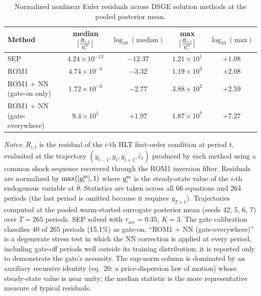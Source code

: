 \documentclass[12pt]{article}
\theoremstyle{plain}
\theoremstyle{definition}
\theoremstyle{remark}
\newcommand{\tablenotes}[1]{%
  \par\vspace{0.5em}%
  \noindent\begin{minipage}{\textwidth}%
  \raggedright\footnotesize #1%
  \end{minipage}\par%
}
\begin{document}
\begin{table}[htbp]
\centering
\caption{Normalized nonlinear Euler residuals across DSGE solution methods at the pooled posterior mean.}
\label{tab:euler_errors}
\small
\begin{tabular}{lcccc}
\toprule
Method & median $\bigl|\tfrac{R_{i,t}}{y^{\rm ss}_i}\bigr|$ & $\log_{10}(\text{median})$ & max $\bigl|\tfrac{R_{i,t}}{y^{\rm ss}_i}\bigr|$ & $\log_{10}(\text{max})$ \\
\midrule
SEP                              & $4.24 \times 10^{-13}$ & $-12.37$ & $1.21 \times 10^{1}$ & $+1.08$ \\
ROM1                             & $4.74 \times 10^{-4}$  & $-3.32$  & $1.19 \times 10^{2}$ & $+2.08$ \\
ROM1 + NN (gate-on only)         & $1.72 \times 10^{-3}$  & $-2.77$  & $3.88 \times 10^{2}$ & $+2.59$ \\
ROM1 + NN (gate-everywhere)      & $9.4 \times 10^{1}$    & $+1.97$  & $1.87 \times 10^{7}$ & $+7.27$ \\
\bottomrule
\end{tabular}
\smallskip
\tablenotes{\textit{Notes}: $R_{i,t}$ is the residual of the $i$-th HLT first-order condition at period $t$, evaluated at the trajectory $(y_{t-1}, y_t, y_{t+1}, \hat{\varepsilon}_t)$ produced by each method using a common shock sequence recovered through the ROM1 inversion filter. Residuals are normalized by $\max(|y^{\rm ss}_i|, 1)$ where $y^{\rm ss}_i$ is the steady-state value of the $i$-th endogenous variable at $\bar{\theta}$. Statistics are taken across all 66 equations and 264 periods (the last period is omitted because it requires $y_{T+1}$). Trajectories computed at the pooled warm-started surrogate posterior mean (seeds 42, 5, 6, 7) over $T = 265$ periods. SEP solved with $\tau_{\text{acc}} = 0.35$, $K = 3$. The gate calibration classifies $40$ of $265$ periods (15.1\%) as gate-on. ``ROM1 + NN (gate-everywhere)'' is a degenerate stress test in which the NN correction is applied at every period, including gate-off periods well outside its training distribution; it is reported only to demonstrate the gate's necessity. The sup-norm column is dominated by an auxiliary recursive identity (eq.\ 20: a price-dispersion law of motion) whose steady-state value is near unity; the median statistic is the more representative measure of typical residuals.}
\end{table}
\end{document}
